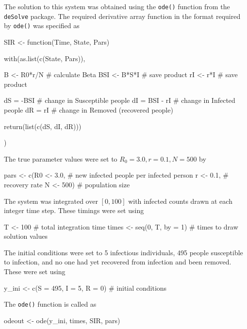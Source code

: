 \documentclass[12pt]{article}
\begin{document}
    The solution to this system was obtained using the \verb|ode()| function from the \verb|deSolve| package. The required derivative array function in the format required by \verb|ode()| was specified as

    \begin{R}    
    SIR <- function(Time, State, Pars) {

        with(as.list(c(State, Pars)), {
            
            B   <- R0*r/N    # calculate Beta
            BSI <- B*S*I     # save product
            rI  <- r*I       # save product
            
            dS = -BSI       # change in Susceptible people
            dI = BSI - rI   # change in Infected people
            dR = rI         # change in Removed (recovered people)
            
            return(list(c(dS, dI, dR)))
            
        })
        
    }
    \end{R}

    The true parameter values were set to $R_0 = 3.0, r = 0.1, N = 500$ by

    \begin{R}
    pars  <- c(R0  <- 3.0,  # new infected people per infected person
              r   <- 0.1,  # recovery rate
              N   <- 500)  # population size
    \end{R}

    The system was integrated over $[0,100]$ with infected counts drawn at each integer time step. These timings were set using

    \begin{R}
    T <- 100                            # total integration time
    times <- seq(0, T, by = 1)          # times to draw solution values
    \end{R}

    The initial conditions were set to 5 infectious individuals, 495 people susceptible to infection, and no one had yet recovered from infection and been removed. These were set using

    \begin{R}
    y_ini <- c(S = 495, I = 5, R = 0)   # initial conditions
    \end{R}

    The \verb|ode()| function is called as

    \begin{R}
    odeout <- ode(y_ini, times, SIR, pars)
    \end{R}
\end{document}
